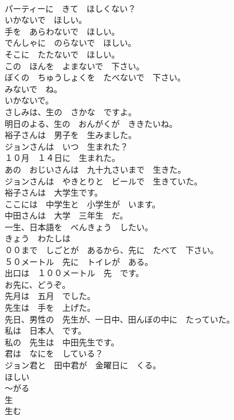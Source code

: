 \documentclass[8pt]{extreport}
\begin{document}
\begin{CJK}{UTF8}{min}
\\	パーティーに　きて　ほしくない？	
\\	いかないで　ほしい。	
\\	手を　あらわないで　ほしい。	
\\	でんしゃに　のらないで　ほしい。	
\\	そこに　たたないで　ほしい。	
\\	この　ほんを　よまないで　下さい。	
\\	ぼくの　ちゅうしょくを　たべないで　下さい。	
\\	みないで　ね。	
\\	いかないで。	
\\	さしみは、生の　さかな　ですよ。	
\\	明日のよる、生の　おんがくが　ききたいね。	
\\	裕子さんは　男子を　生みました。	
\\	ジョンさんは　いつ　生まれた？	
\\	１０月　１４日に　生まれた。	
\\	あの　おじいさんは　九十九さいまで　生きた。	
\\	ジョンさんは　やきとりと　ビールで　生きていた。	
\\	裕子さんは　大学生です。	
\\	ここには　中学生と　小学生が　います。	
\\	中田さんは　大学　三年生　だ。	
\\	一生、日本語を　べんきょう　したい。	
\\	きょう　わたしは　
\\	００まで　しごとが　あるから、先に　たべて　下さい。	
\\	５０メートル　先に　トイレが　ある。	
\\	出口は　１００メートル　先　です。	
\\	お先に、どうぞ。	
\\	先月は　五月　でした。	
\\	先生は　手を　上げた。	
\\	先日、男性の　先生が、一日中、田んぼの中に　たっていた。	
\\	私は　日本人　です。	
\\	私の　先生は　中田先生です。	
\\	君は　なにを　している？	
\\	ジョン君と　田中君が　金曜日に　くる。	
\\	ほしい	
\\	～がる	
\\	生	
\\	生む	

\end{CJK}
\end{document}
